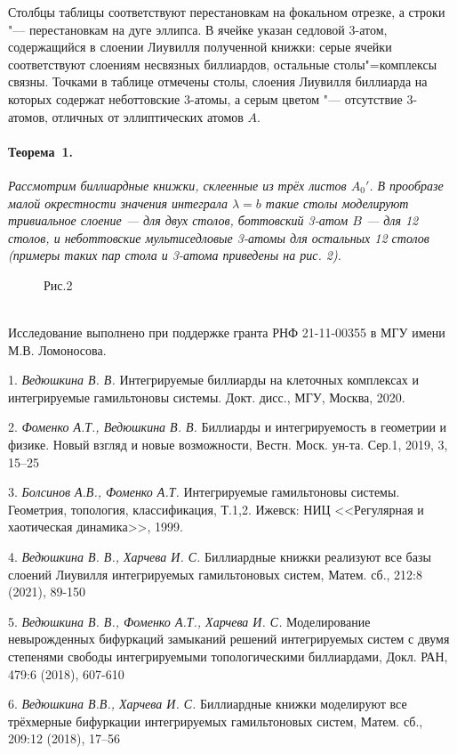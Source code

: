 Столбцы таблицы соответствуют перестановкам на фокальном отрезке, а строки "--- перестановкам на дуге эллипса. В ячейке указан седловой 3-атом, содержащийся в слоении Лиувилля полученной книжки: серые ячейки соответствуют слоениям несвязных биллиардов, остальные столы"=комплексы связны. Точками в таблице отмечены столы, слоения Лиувилля биллиарда на которых содержат неботтовские 3-атомы, а серым цветом "--- отсутствие 3-атомов, отличных от эллиптических атомов $A$.\\

 \vspace*{-0.6cm}
\paragraph{Теорема~1.}
{\it
	Рассмотрим биллиардные книжки, склеенные из трёх листов $A_0'$. В прообразе малой окрестности значения интеграла $\lambda=b$ такие столы моделируют тривиальное слоение — для двух столов, боттовский 3-атом $B$ — для 12 столов, и неботтовские мультиседловые 3-атомы для остальных 12 столов (примеры таких пар стола и 3-атома приведены на рис. 2).
}
\vspace*{-0.5cm}
\begin{figure}[h!]
\begin{minipage}[h!]{0.49\linewidth}
\end{minipage}
\begin{minipage}[h!]{0.49\linewidth}
\end{minipage}
\begin{center}
Рис.2
\end{center}
\end{figure}\\

\vspace*{-0.8cm}
Исследование выполнено при поддержке гранта РНФ 21-11-00355 в МГУ имени М.В. Ломоносова.

\litlist


1. {\it Ведюшкина В. В.}
 Интегрируемые биллиарды на клеточных комплексах и интегрируемые гамильтоновы системы. Докт. дисс., МГУ, Москва, 2020.

2. {\it Фоменко А.Т., Ведюшкина В. В.}
 Биллиарды и интегрируемость в геометрии и физике. Новый взгляд и новые возможности, Вестн. Моск. ун-та. Сер.1, 2019, 3, 15–25

3.  {\it Болсинов А.В., Фоменко А.Т.}
 Интегрируемые гамильтоновы системы. Геометрия, топология, классификация, Т.1,2. Ижевск: НИЦ <<Регулярная и хаотическая динамика>>, 1999.

4. {\it Ведюшкина В. В., Харчева И. С.}
 Биллиардные книжки реализуют все базы слоений Лиувилля интегрируемых гамильтоновых систем, Матем. сб., 212:8 (2021),  89-150

5. {\it Ведюшкина В. В., Фоменко А.Т., Харчева И. С.}
 Моделирование невырожденных бифуркаций замыканий решений интегрируемых систем с двумя степенями свободы интегрируемыми топологическими биллиардами, Докл. РАН, 479:6 (2018), 607-610

 6. {\it Ведюшкина В.В., Харчева И. С.}
 Биллиардные книжки моделируют все трёхмерные бифуркации интегрируемых гамильтоновых систем, Матем. сб., 209:12 (2018), 17–56
